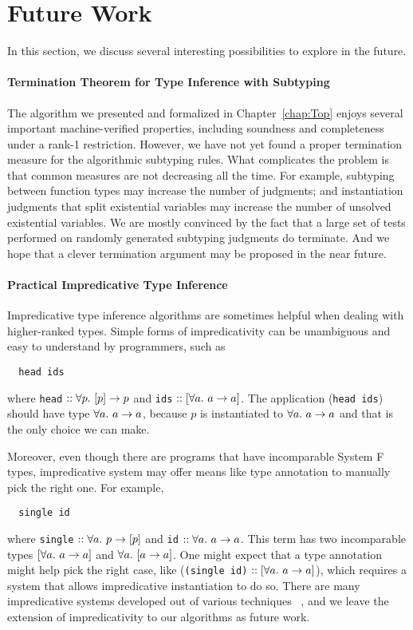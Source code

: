 \section{Future Work}

In this section, we discuss several interesting possibilities to explore in the future.

\paragraph{Termination Theorem for Type Inference with Subtyping}
The algorithm we presented and formalized in Chapter~\ref{chap:Top}
enjoys several important machine-verified properties,
including soundness and completeness under a rank-1 restriction.
However, we have not yet found a proper termination measure
for the algorithmic subtyping rules.
What complicates the problem is that
common measures are not decreasing all the time.
For example, subtyping between function types may increase the number of judgments;
and instantiation judgments that split existential variables may increase the number of
unsolved existential variables.
We are mostly convinced by the fact that
a large set of tests performed on randomly generated
subtyping judgments do terminate.
And we hope that a clever termination argument may be proposed in the near future.

\paragraph{Practical Impredicative Type Inference}
Impredicative type inference algorithms are sometimes helpful when dealing with
higher-ranked types.
Simple forms of impredicativity can be unambiguous and easy to understand by programmers,
such as
\begin{verbatim}
  head ids
\end{verbatim}
where \verb|head| $ :: \all[p] [p] \to p$ and \verb|ids| $ :: [\all a \to a]$.
The application (\verb|head ids|) should have type $\all a \to a$,
because $p$ is instantiated to $\all a \to a$ and that is the only choice we can make.

Moreover, even though there are programs that have incomparable System F types,
impredicative system may offer means like type annotation to manually pick the right one.
For example,
\begin{verbatim}
  single id
\end{verbatim}
where \verb|single| $ :: \all p \to [p]$ and \verb|id| $ :: \all a \to a$.
This term has two incomparable types $[\all a \to a]$ and $\all[a] [a \to a]$.
One might expect that a type annotation might help pick the right case,
like (\verb|(single id)| $ :: [\all a \to a]$),
which requires a system that allows impredicative instantiation to do so.
There are many impredicative systems developed out of various techniques~
\citep{le2003ml,leijen2008hmf,leijen2009flexible,vytiniotis2008fph,
Serrano2018,quicklook2020,FreezeML},
and we leave the extension of impredicativity to our algorithms as future work.

